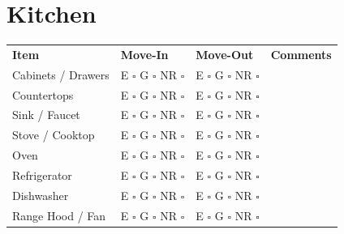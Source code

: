 
\section*{Kitchen}
\label{sec:kitchen}

\begin{longtable}{p{6cm} p{3cm} p{3cm} p{4cm}}
\textbf{Item} & \textbf{Move-In} & \textbf{Move-Out} & \textbf{Comments} \\
Cabinets / Drawers & E $\square$ G $\square$ NR $\square$ & E $\square$ G $\square$ NR $\square$ & \\
Countertops & E $\square$ G $\square$ NR $\square$ & E $\square$ G $\square$ NR $\square$ & \\
Sink / Faucet & E $\square$ G $\square$ NR $\square$ & E $\square$ G $\square$ NR $\square$ & \\
Stove / Cooktop & E $\square$ G $\square$ NR $\square$ & E $\square$ G $\square$ NR $\square$ & \\
Oven & E $\square$ G $\square$ NR $\square$ & E $\square$ G $\square$ NR $\square$ & \\
Refrigerator & E $\square$ G $\square$ NR $\square$ & E $\square$ G $\square$ NR $\square$ & \\
Dishwasher & E $\square$ G $\square$ NR $\square$ & E $\square$ G $\square$ NR $\square$ & \\
Range Hood / Fan & E $\square$ G $\square$ NR $\square$ & E $\square$ G $\square$ NR $\square$ & \\
\end{longtable}

